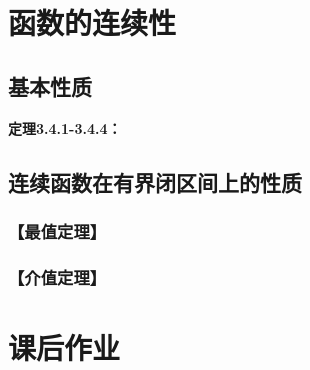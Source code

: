 \section{函数的连续性}



\subsection{基本性质}

{\bf 定理3.4.1-3.4.4：}


\subsection{连续函数在有界闭区间上的性质}

\subsubsection{【最值定理】}


\subsubsection{【介值定理】}



% 
% 
% 
% 
% 
% 
% 



\newpage

\section*{课后作业}

